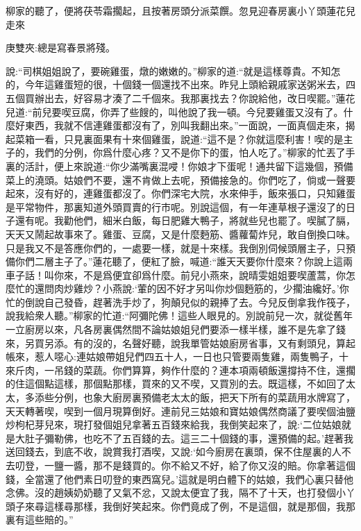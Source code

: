 \begin{parag}
    柳家的聽了，便將茯苓霜擱起，且按著房頭分派菜饌。忽見迎春房裏小丫頭蓮花兒走來\begin{note}庚雙夾:總是寫春景將殘。\end{note}說:“司棋姐姐說了，要碗雞蛋，燉的嫩嫩的。”柳家的道:“就是這樣尊貴。不知怎的，今年這雞蛋短的很，十個錢一個還找不出來。昨兒上頭給親戚家送粥米去，四五個買辦出去，好容易才湊了二千個來。我那裏找去？你說給他，改日喫罷。”蓮花兒道:“前兒要喫豆腐，你弄了些餿的，叫他說了我一頓。今兒要雞蛋又沒有了。什麼好東西，我就不信連雞蛋都沒有了，別叫我翻出來。”一面說，一面真個走來，揭起菜箱一看，只見裏面果有十來個雞蛋，說道:“這不是？你就這麼利害！喫的是主子的，我們的分例，你爲什麼心疼？又不是你下的蛋，怕人吃了。”柳家的忙丟了手裏的活計，便上來說道:“你少滿嘴裏混唚！你娘才下蛋呢！通共留下這幾個，預備菜上的澆頭。姑娘們不要，還不肯做上去呢，預備接急的。你們吃了，倘或一聲要起來，沒有好的，連雞蛋都沒了。你們深宅大院，水來伸手，飯來張口，只知雞蛋是平常物件，那裏知道外頭買賣的行市呢。別說這個，有一年連草根子還沒了的日子還有呢。我勸他們，細米白飯，每日肥雞大鴨子，將就些兒也罷了。喫膩了膈，天天又鬧起故事來了。雞蛋、豆腐，又是什麼麪筋、醬蘿蔔炸兒，敢自倒換口味。只是我又不是答應你們的，一處要一樣，就是十來樣。我倒別伺候頭層主子，只預備你們二層主子了。”蓮花聽了，便紅了臉，喊道:“誰天天要你什麼來？你說上這兩車子話！叫你來，不是爲便宜卻爲什麼。前兒小燕來，說晴雯姐姐要喫蘆蒿，你怎麼忙的還問肉炒雞炒？小燕說:‘葷的因不好才另叫你炒個麪筋的，少擱油纔好。’你忙的倒說自己發昏，趕著洗手炒了，狗顛兒似的親捧了去。今兒反倒拿我作筏子，說我給衆人聽。”柳家的忙道:“阿彌陀佛！這些人眼見的。別說前兒一次，就從舊年一立廚房以來，凡各房裏偶然間不論姑娘姐兒們要添一樣半樣，誰不是先拿了錢來，另買另添。有的沒的，名聲好聽，說我單管姑娘廚房省事，又有剩頭兒，算起帳來，惹人噁心:連姑娘帶姐兒們四五十人，一日也只管要兩隻雞，兩隻鴨子，十來斤肉，一吊錢的菜蔬。你們算算，夠作什麼的？連本項兩頓飯還撐持不住，還擱的住這個點這樣，那個點那樣，買來的又不喫，又買別的去。既這樣，不如回了太太，多添些分例，也象大廚房裏預備老太太的飯，把天下所有的菜蔬用水牌寫了，天天轉著喫，喫到一個月現算倒好。連前兒三姑娘和寶姑娘偶然商議了要喫個油鹽炒枸杞芽兒來，現打發個姐兒拿著五百錢來給我，我倒笑起來了，說:‘二位姑娘就是大肚子彌勒佛，也吃不了五百錢的去。這三二十個錢的事，還預備的起。’趕著我送回錢去，到底不收，說賞我打酒喫，又說:‘如今廚房在裏頭，保不住屋裏的人不去叨登，一鹽一醬，那不是錢買的。你不給又不好，給了你又沒的賠。你拿著這個錢，全當還了他們素日叨登的東西窩兒。’這就是明白體下的姑娘，我們心裏只替他念佛。沒的趙姨奶奶聽了又氣不忿，又說太便宜了我，隔不了十天，也打發個小丫頭子來尋這樣尋那樣，我倒好笑起來。你們竟成了例，不是這個，就是那個，我那裏有這些賠的。”
\end{parag}


